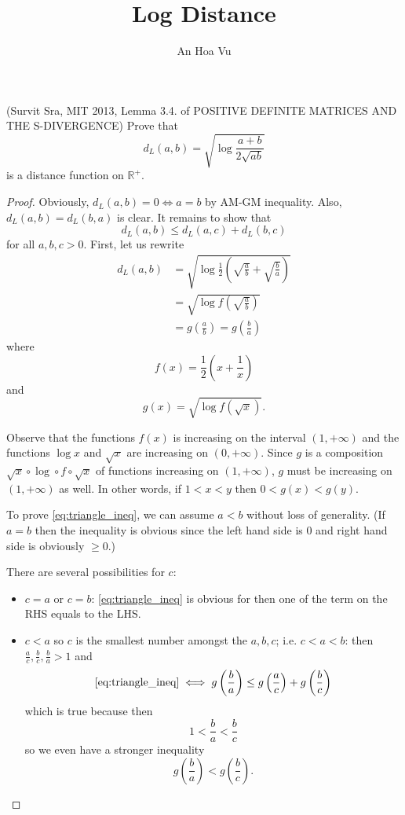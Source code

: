\documentclass[10pt]{amsart}
\title{Log Distance}
\author{An Hoa Vu}
\begin{document}
\maketitle

(Survit Sra, MIT 2013, Lemma 3.4. of POSITIVE DEFINITE MATRICES AND THE S-DIVERGENCE) Prove that
$$d_L(a, b) = \sqrt{\log \frac{a + b}{2\sqrt{ab}}}$$
is a distance function on $\mathbb{R}^+$.

\newcommand{\g}[2]{g\left(\frac{#1}{#2}\right)}

\begin{proof}
Obviously, $d_L(a, b) = 0 \iff a = b$ by AM-GM inequality. Also, $d_L(a, b) = d_L(b, a)$ is clear. It remains to show that
\begin{equation}
d_L(a, b) \leq d_L(a, c) + d_L(b, c)
\label{eq:triangle_ineq}
\end{equation}
for all $a, b, c > 0$. First, let us rewrite
\begin{align*}
d_L(a, b) &= \sqrt{\log \frac{1}{2} \left( {\sqrt{\frac{a}{b}} + \sqrt{\frac{b}{a}}} \right)}\\
&= \sqrt{\log f \left( \sqrt{\frac{a}{b}} \right)}\\
&= \g{a}{b} = \g{b}{a}
\end{align*}
where
$$f(x) = \frac{1}{2}\left(x + \frac{1}{x}\right)$$
and
$$g(x) = \sqrt{\log f(\sqrt{x})}.$$

Observe that the functions $f(x)$ is increasing on the interval $(1, +\infty)$ and the functions $\log x$ and $\sqrt{x}$ are increasing on $(0, +\infty)$. Since $g$ is a composition $\sqrt{x} \circ \log \circ f \circ \sqrt{x}$ of functions increasing on $(1, +\infty)$, $g$ must be increasing on $(1, +\infty)$ as well. In other words, if $1 < x < y$ then $0 < g(x) < g(y)$.

To prove \eqref{eq:triangle_ineq}, we can assume $a < b$ without loss of generality. (If $a = b$ then the inequality is obvious since the left hand side is 0 and right hand side is obviously $\geq 0$.)

There are several possibilities for $c$:
\begin{itemize}
\item $c = a$ or $c = b$: \eqref{eq:triangle_ineq} is obvious for then one of the term on the RHS equals to the LHS.

\item $c < a$ so $c$ is the smallest number amongst the $a, b, c$; i.e. $c < a < b$: then $\frac{a}{c}, \frac{b}{c}, \frac{b}{a} > 1$ and
$$\eqref{eq:triangle_ineq} \iff \g{b}{a} \leq \g{a}{c} + \g{b}{c}$$
which is true because then
$$1 < \frac{b}{a} < \frac{b}{c}$$
so we even have a stronger inequality
$$\g{b}{a} < \g{b}{c}.$$


\end{itemize}
\end{proof}
\end{document}

